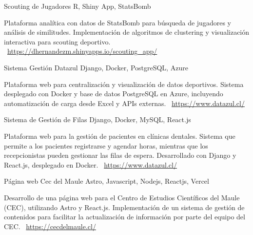 \documentclass[]{awesome-cv}
\begin{document}
\begin{cventries}
	\vspace{-3mm}
	\cventry
	{}
	{Scouting de Jugadores \vspace{-5mm}}
	{R, Shiny App, StatsBomb \vspace{-5mm}}
	{}
	{\begin{cvsectionnormaltext}
		\item {Plataforma analítica con datos de StatsBomb para búsqueda de jugadores y análisis de similitudes. Implementación de algoritmos de clustering y visualización interactiva para scouting deportivo.
		\newline \faLink\ \href{https://dhernandezm.shinyapps.io/scouting_app/}{https://dhernandezm.shinyapps.io/scouting\_app/}}
	\end{cvsectionnormaltext}}

	\vspace{-3mm}
	\cventry
	{}
	{Sistema Gestión Datazul \vspace{-5mm}}
	{Django, Docker, PostgreSQL, Azure \vspace{-5mm}}
	{}
	{\begin{cvsectionnormaltext}
		\item {Plataforma web para centralización y visualización de datos deportivos. Sistema desplegado con Docker y base de datos PostgreSQL en Azure, incluyendo automatización de carga desde Excel y APIs externas.
		\newline \faLink\ \href{https://www.datazul.cl/}{https://www.datazul.cl/}}
	\end{cvsectionnormaltext}}

		\vspace{-3mm}
	\cventry
	{}
	{Sistema de Gestión de Filas \vspace{-5mm}}
	{Django, Docker, MySQL, React.js \vspace{-5mm}}
	{}
	{\begin{cvsectionnormaltext}
		\item {Plataforma web para la gestión de pacientes en clínicas dentales. Sistema que permite a los pacientes registrarse y agendar horas, mientras que los recepcionistas pueden gestionar las filas de espera. Desarrollado con Django y React.js, desplegado en Docker.
		\newline \faLink\ \href{https://www.datazul.cl/}{https://www.datazul.cl/}}
	\end{cvsectionnormaltext}}

	\vspace{-3mm}
	\cventry
	{}
	{Página web Cec del Maule \vspace{-5mm}}
	{Astro, Javascript, Nodejs, Reactjs, Vercel \vspace{-5mm}}
	{}
	{\begin{cvsectionnormaltext}
		\item {Desarrollo de una página web para el Centro de Estudios Científicos del Maule (CEC), utilizando Astro y React.js. Implementación de un sistema de gestión de contenidos para facilitar la actualización de información por parte del equipo del CEC.
		\newline \faLink\ \href{https://cecdelmaule.cl/}{https://cecdelmaule.cl/}}
	\end{cvsectionnormaltext}}


\end{cventries}
\end{document}
